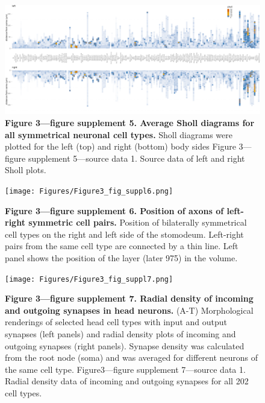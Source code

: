\documentclass[
  11pt,
]{article}
\begin{document}
\begin{figure}[H]

{\centering \includegraphics[width=1\textwidth,height=\textheight]{Figures/Figure3_fig_suppl5.png}

}

\caption{\textbf{Figure 3---figure supplement 5. Average Sholl diagrams
for all symmetrical neuronal cell types.} Sholl diagrams were plotted
for the left (top) and right (bottom) body sides Figure 3---figure
supplement 5---source data 1. Source data of left and right Sholl
plots.}

\end{figure}%

\begin{figure}[H]

{\centering \texttt{[image: Figures/Figure3\_fig\_suppl6.png]}

}

\caption{\textbf{Figure 3---figure supplement 6. Position of axons of
left-right symmetric cell pairs. } Position of bilaterally symmetrical
cell types on the right and left side of the stomodeum. Left-right pairs
from the same cell type are connected by a thin line. Left panel shows
the position of the layer (later 975) in the volume.}

\end{figure}%

\begin{figure}[H]

{\centering \texttt{[image: Figures/Figure3\_fig\_suppl7.png]}

}

\caption{\textbf{Figure 3---figure supplement 7. Radial density of
incoming and outgoing synapses in head neurons. } (A-T) Morphological
renderings of selected head cell types with input and output synapses
(left panels) and radial density plots of incoming and outgoing synapses
(right panels). Synapse density was calculated from the root node (soma)
and was averaged for different neurons of the same cell type.
Figure3---figure supplement 7---source data 1. Radial density data of
incoming and outgoing synapses for all 202 cell types.}

\end{figure}%
\end{document}
